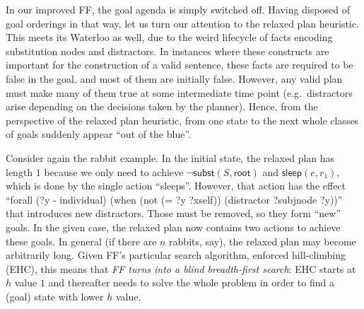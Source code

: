 In our improved FF, the goal agenda is simply switched off. Having
disposed of goal orderings in that way, let us turn our attention to
the relaxed plan heuristic. %
This meets its Waterloo as well, due to the weird lifecycle of facts
encoding substitution nodes and distractors. In instances where these
constructs are important for the construction of a valid sentence,
these facts are required to be false in the goal, and most of them are
initially false. However, any valid plan must make many of them true
at some intermediate time point (e.g.\ distractors arise depending on
the decisions taken by the planner). Hence, from the perspective of
the relaxed plan heuristic, from one state to the next whole classes
of goals suddenly appear ``out of the blue''. 


Consider again the rabbit example. In the initial state, the relaxed
plan has length $1$ because we only need to achieve $\neg
\mathsf{subst}(S,\mathsf{root})$ and $\mathsf{sleep}(e,r_1)$, which is
done by the single action ``sleeps''. However, that action has the
effect ``forall (?y - individual) (when (not (= ?y ?xself))
(distractor ?subjnode ?y))'' that introduces new distractors. Those
must be removed, so they form ``new'' goals. In the given case, the
relaxed plan now contains two actions to achieve these goals. In
general (if there are $n$ rabbits, say), the relaxed plan may become
arbitrarily long.
Given FF's particular search algorithm, enforced hill-climbing (EHC),
this means that {\em FF turns into a blind breadth-first search}: EHC
starts at $h$ value $1$ and thereafter needs to solve the whole
problem in order to find a (goal) state with lower $h$ value.

